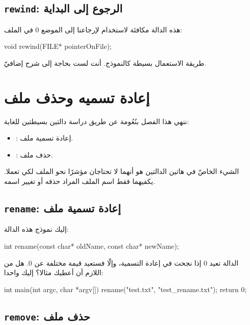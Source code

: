 \subsection{\texttt{rewind}: الرجوع إلى البداية}

هذه الدالة مكافئة لاستخدام
لإرجاعنا إلى الموضع 0 في الملف:

\begin{Csource}
void rewind(FILE* pointerOnFile);
\end{Csource}

طريقة الاستعمال بسيطة كالنموذج. أنت لست بحاجة إلى شرح إضافيّ.

\section{إعادة تسميه وحذف ملف}

ننهي هذا الفصل بنُعُومة عن طريق دراسة دالتين بسيطتين للغاية:

\begin{itemize}
  \item {}:
  إعادة تسمية ملف.
  \item {}:
  حذف ملف.
\end{itemize}

الشيء الخاصّ في هاتين الدالتين هو أنهما لا تحتاجان مؤشرًا نحو الملف لكي تعملا. يكفيهما فقط اسم الملف المراد حذفه أو تغيير اسمه.

\subsection{\texttt{rename}: إعادة تسمية ملف}

إليك نموذج هذه الدالة:

\begin{Csource}
int rename(const char* oldName, const char* newName);
\end{Csource}

الدالة تعيد 0 إذا نجحت في إعادة التسمية،  وإلّا فستعيد قيمة مختلفة عن 0. هل من اللازم أن أعطيك مثالا؟ إليك واحدا:

\begin{Csource}
int main(int argc, char *argv[])
{
    rename("test.txt", "test_rename.txt");
    return 0;
}
\end{Csource}

\subsection{\texttt{remove}: حذف ملف}

